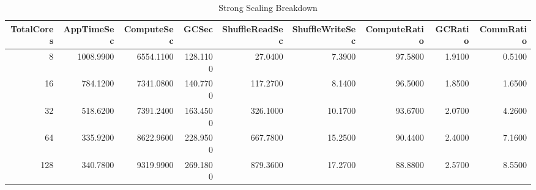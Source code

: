 \begin{table}
\caption{Strong Scaling Breakdown}
\label{tab:table2_strong_breakdown}
\begin{tabular}{rrrrrrrrr}
\toprule
TotalCores & AppTimeSec & ComputeSec & GCSec & ShuffleReadSec & ShuffleWriteSec & ComputeRatio & GCRatio & CommRatio \\
\midrule
8 & 1008.9900 & 6554.1100 & 128.1100 & 27.0400 & 7.3900 & 97.5800 & 1.9100 & 0.5100 \\
16 & 784.1200 & 7341.0800 & 140.7700 & 117.2700 & 8.1400 & 96.5000 & 1.8500 & 1.6500 \\
32 & 518.6200 & 7391.2400 & 163.4500 & 326.1000 & 10.1700 & 93.6700 & 2.0700 & 4.2600 \\
64 & 335.9200 & 8622.9600 & 228.9500 & 667.7800 & 15.2500 & 90.4400 & 2.4000 & 7.1600 \\
128 & 340.7800 & 9319.9900 & 269.1800 & 879.3600 & 17.2700 & 88.8800 & 2.5700 & 8.5500 \\
\bottomrule
\end{tabular}
\end{table}
